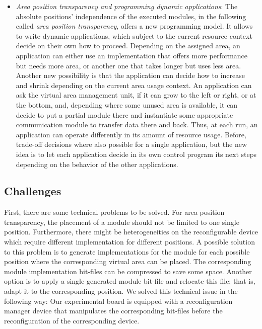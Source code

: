 \documentclass[10pt,journal]{IEEEtran}
\begin{document}
\begin{itemize}
\item \emph{Area position transparency and programming dynamic
    applications}: The absolute positions' independence of the
  executed modules, in the following called {\em area position
  transparency}, offers a new programming model. It
  allows to write dynamic applications, which subject to
  the current resource context decide on their own how to
  proceed. 
  Depending on the assigned area, an application can either use an
  implementation that offers more performance but needs more
  area, or another one that takes longer but uses less area. 
  Another new possibility
  is that the application can decide how to increase and shrink
  depending on the current area usage context. An application can ask
  the virtual area management unit, if it can grow to the left or
  right, or at the bottom, and, depending where some unused area is
  available, it can decide to put a partial module there and
  instantiate some appropriate communication module to transfer data
  there and back. Thus, at each run, an application can operate differently in
  its amount of resource usage. Before, trade-off decisions where also
  possible for a single application, but the new idea is to let
  each application decide in its own control program its next steps
  depending on the behavior of the other applications.

\end{itemize}

\subsection{Challenges}

First, there are some technical problems to be solved. For area
position transparency, the placement of a module should not
be limited to one single position. Furthermore, there might be
heterogeneities on the reconfigurable device which require
different implementation for different positions. A possible solution to this
problem is to generate implementations for the module for each
possible position where the corresponding virtual area can be
placed. The corresponding module implementation bit-files can be
compressed to save some space. Another option is to apply a
single generated module bit-file and relocate this file; that is, adapt it to
the corresponding position. We solved this technical
issue in the following way: Our experimental board is equipped with a
reconfiguration manager device that manipulates the corresponding
bit-files before the reconfiguration of the corresponding device.
\end{document}
